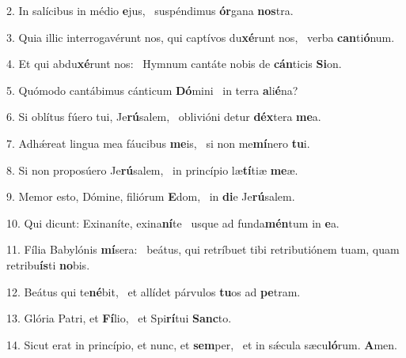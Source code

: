 2. In salícibus in médio \textbf{e}jus, \ast\  suspéndimus \textbf{ór}gana \textbf{nos}tra.\

3. Quia illic interrogavérunt nos, qui captívos du\textbf{xé}runt nos, \ast\  verba \textbf{can}ti\textbf{ó}num.\

4. Et qui abdu\textbf{xé}runt nos: \ast\  Hymnum cantáte nobis de \textbf{cán}ticis \textbf{Si}on.\

5. Quómodo cantábimus cánticum \textbf{Dó}mini \ast\  in terra \textbf{a}li\textbf{é}na?\

6. Si oblítus fúero tui, Je\textbf{rú}salem, \ast\  oblivióni detur \textbf{déx}tera \textbf{me}a.\

7. Adhǽreat lingua mea fáucibus \textbf{me}is, \ast\  si non me\textbf{mí}nero \textbf{tu}i.\

8. Si non proposúero Je\textbf{rú}salem, \ast\  in princípio læ\textbf{tí}tiæ \textbf{me}æ.\

9. Memor esto, Dómine, filiórum \textbf{E}dom, \ast\  in \textbf{di}e Je\textbf{rú}salem.\

10. Qui dicunt: Exinaníte, exina\textbf{ní}te \ast\  usque ad funda\textbf{mén}tum in \textbf{e}a.\

11. Fília Babylónis \textbf{mí}sera: \ast\  beátus, qui retríbuet tibi retributiónem tuam, quam retribu\textbf{ís}ti \textbf{no}bis.\

12. Beátus qui te\textbf{né}bit, \ast\  et allídet párvulos \textbf{tu}os ad \textbf{pe}tram.\

13. Glória Patri, et \textbf{Fí}lio, \ast\  et Spi\textbf{rí}tui \textbf{Sanc}to.\

14. Sicut erat in princípio, et nunc, et \textbf{sem}per, \ast\  et in sǽcula sæcu\textbf{ló}rum. \textbf{A}men.\

